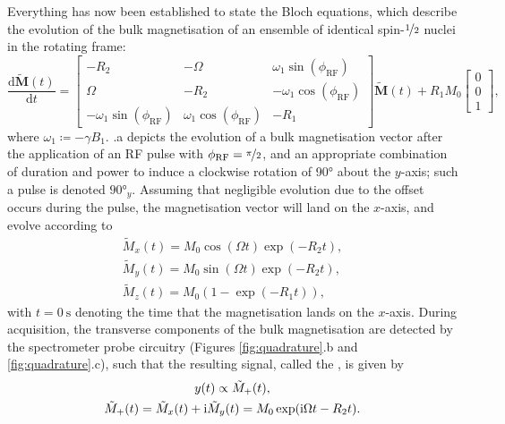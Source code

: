 Everything has now been established to state the Bloch equations, which
describe the evolution of the bulk magnetisation of an ensemble of identical
spin-$\nicefrac{1}{2}$ nuclei in the rotating frame:
\begin{equation}
    \frac{\mathrm{d}\tilde{\symbf{M}}(t)}{\mathrm{d}t} =
    \begin{bmatrix}
        -R_2 & -\Omega & \omega_1 \sin(\phi_{\text{RF}}) \\
        \Omega & -R_2 & -\omega_1 \cos(\phi_{\text{RF}}) \\
        -\omega_1 \sin(\phi_{\text{RF}}) & \omega_1 \cos(\phi_{\text{RF}}) & -R_1
    \end{bmatrix}
    \tilde{\symbf{M}}(t)
    + R_1 M_0
    \begin{bmatrix}
        0 \\ 0 \\ 1
    \end{bmatrix},
\end{equation}
where $\omega_1 \coloneq -\gamma B_1$.
.a depicts the
evolution of a bulk magnetisation vector after the application of an
\ac{RF} pulse with $\phi_{\text{RF}} = \nicefrac{\pi}{2}$, and an appropriate
combination of duration and power to induce a clockwise rotation of \ang{90}
about the $y$-axis; such a pulse is denoted $\ang{90}_{y}$.
Assuming that negligible evolution due to the offset occurs during the pulse,
the magnetisation vector will land on the $x$-axis, and evolve according to
\begin{subequations}
    \begin{gather}
        \tilde{M}_x(t) = M_0 \cos(\Omega t) \exp(-R_2 t),\\
        \tilde{M}_y(t) = M_0 \sin(\Omega t) \exp(-R_2 t),\\
        \tilde{M}_z(t) = M_0 (1 - \exp(-R_1 t)),
    \end{gather}
\end{subequations}
with $t=\qty{0}{\second}$ denoting the time that the magnetisation lands on the
$x$-axis.
During acquisition, the transverse components of the bulk magnetisation are
detected by the spectrometer probe circuitry
(Figures \ref{fig:quadrature}.b and \ref{fig:quadrature}.c), such that the
resulting signal, called the , is given by
\begin{subequations}
    \begin{gather}
        y(t) \propto \tilde{M}_+(t),\\
        \tilde{M}_+(t) = \tilde{M}_x (t) + \mathrm{i} \tilde{M}_y (t) = M_0 \exp(\mathrm{i} \Omega t - R_2 t).
    \end{gather}
\end{subequations}

